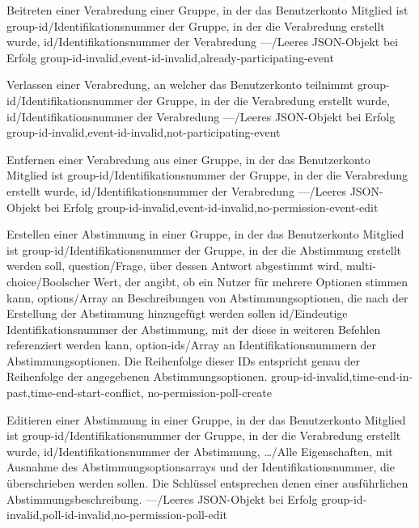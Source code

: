 \documentclass[parskip=full,11pt]{scrartcl}
\begin{document}
{Beitreten einer Verabredung einer Gruppe, in der das Benutzerkonto Mitglied
ist}
{group-id/Identifikationsnummer der Gruppe{,} in der die Verabredung erstellt
wurde,
id/Identifikationsnummer der Verabredung}
{---/Leeres JSON-Objekt bei Erfolg}
{group-id-invalid,event-id-invalid,already-participating-event}

{Verlassen einer Verabredung, an welcher das Benutzerkonto teilnimmt}
{group-id/Identifikationsnummer der Gruppe{,} in der die Verabredung erstellt
wurde,
id/Identifikationsnummer der Verabredung}
{---/Leeres JSON-Objekt bei Erfolg}
{group-id-invalid,event-id-invalid,not-participating-event}

{Entfernen einer Verabredung aus einer Gruppe, in der das Benutzerkonto
Mitglied ist}
{group-id/Identifikationsnummer der Gruppe{,} in der die Verabredung erstellt
wurde,
id/Identifikationsnummer der Verabredung}
{---/Leeres JSON-Objekt bei Erfolg}
{group-id-invalid,event-id-invalid,no-permission-event-edit}

{Erstellen einer Abstimmung in einer Gruppe, in der das Benutzerkonto Mitglied
ist}
{group-id/Identifikationsnummer der Gruppe{,} in der die Abstimmung erstellt
werden soll,
question/Frage{,} über dessen Antwort abgestimmt wird,
multi-choice/Boolscher Wert{,} der angibt{,} ob ein Nutzer für mehrere
Optionen stimmen kann,
options/Array an Beschreibungen von Abstimmungsoptionen{,} die nach der
Erstellung der Abstimmung hinzugefügt werden sollen}
{id/Eindeutige Identifikationsnummer der Abstimmung{,} mit der diese in
weiteren Befehlen referenziert werden kann,
option-ids/Array an Identifikationsnummern der Abstimmungsoptionen. Die
Reihenfolge dieser IDs entspricht genau der Reihenfolge der angegebenen
Abstimmungsoptionen.}
{group-id-invalid,time-end-in-past,time-end-start-conflict,
no-permission-poll-create}

{Editieren einer Abstimmung in einer Gruppe, in der das Benutzerkonto Mitglied
ist}
{group-id/Identifikationsnummer der Gruppe{,} in der die Verabredung erstellt
wurde,
id/Identifikationsnummer der Abstimmung,
\dots/Alle Eigenschaften{,} mit Ausnahme des Abstimmungsoptionsarrays und der
Identifikationsnummer{,} die überschrieben werden sollen.
Die Schlüssel entsprechen denen einer ausführlichen Abstimmungsbeschreibung.}
{---/Leeres JSON-Objekt bei Erfolg}
{group-id-invalid,poll-id-invalid,no-permission-poll-edit}
\end{document}
